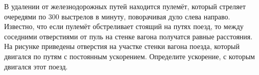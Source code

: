 В удалении от железнодорожных путей находится пулемёт, который стреляет очередями по $300$ выстрелов в минуту, поворачивая дуло слева направо. Известно, что если пулемёт обстреливает стоящий на путях поезд, то между соседними отверстиями от пуль на стенке вагона получатся равные расстояния. На рисунке приведены отверстия на участке стенки вагона поезда, который двигался по путям с постоянным ускорением. Определите ускорение, с которым двигался этот поезд.

